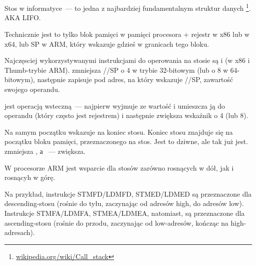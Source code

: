 \section{\Stack}
\label{sec:stack}
\myindex{\Stack}

Stos w informatyce~--- to jedna z najbardziej fundamentalnym struktur danych
\footnote{\href{http://go.yurichev.com/17119}{wikipedia.org/wiki/Call\_stack}}.
\ac{AKA} \ac{LIFO}.

Technicznie jest to tylko blok pamięci w pamięci procesora + rejestr \ESP w x86 lub \RSP w x64, lub \ac{SP} w ARM, który wskazuje gdzieś w granicach tego bloku.

Najczęsciej wykorzystywanymi instrukcjami do operowania na stosie są \PUSH i \POP (w x86 i Thumb-trybie ARM). 
\PUSH zmniejsza \ESP/\RSP/\ac{SP} o 4 w trybie 32-bitowym (lub o 8 w 64-bitowym),
następnie zapisuje pod adres, na który wskazuje \ESP/\RSP/\ac{SP}, zawartość swojego operandu.

\POP jest operacją wsteczną~--- najpierw wyjmuje ze  wartość i umieszcza ją do operandu 
(który często jest rejestrem) i następnie zwiększa wskaźnik o 4 (lub 8).

Na samym początku  wskazuje na koniec stosu.
Koniec stosu znajduje się na początku bloku pamięci, przeznaczonego na stos. Jest to dziwne, ale tak już jest.
\PUSH zmniejsza , а \POP~--- zwiększa.

W procesorze ARM jest wsparcie dla stosów zarówno rosnących w dół, jak i rosnącyh w górę.


Na przykład, instrukcje \ac{STMFD}/\ac{LDMFD}, \ac{STMED}/\ac{LDMED} są przeznaczone dla descending-stosu (rośnie do tyłu, zaczynając od adresów high, do adresów low).\\
Instrukcje \ac{STMFA}/\ac{LDMFA}, \ac{STMEA}/\ac{LDMEA}, natomiast, są przeznaczone dla ascending-stosu (rośnie do przodu, zaczynając od low-adresów, kończąc na high-adresach).


